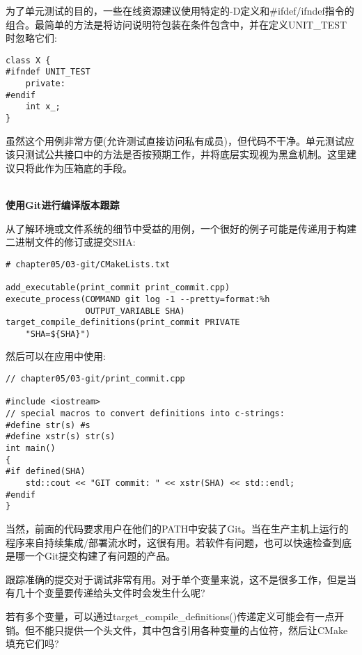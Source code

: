 为了单元测试的目的，一些在线资源建议使用特定的-D定义和\#ifdef/ifndef指令的组合。最简单的方法是将访问说明符包装在条件包含中，并在定义UNIT\_TEST时忽略它们:

\begin{lstlisting}[style=styleCXX]
class X {
#ifndef UNIT_TEST
	private:
#endif
	int x_;
}
\end{lstlisting}

虽然这个用例非常方便(允许测试直接访问私有成员)，但代码不干净。单元测试应该只测试公共接口中的方法是否按预期工作，并将底层实现视为黑盒机制。这里建议只将此作为压箱底的手段。

\hspace*{\fill} \\ %
\noindent
\textbf{使用Git进行编译版本跟踪}

从了解环境或文件系统的细节中受益的用例，一个很好的例子可能是传递用于构建二进制文件的修订或提交SHA:

\begin{lstlisting}[style=styleCMake]
# chapter05/03-git/CMakeLists.txt

add_executable(print_commit print_commit.cpp)
execute_process(COMMAND git log -1 --pretty=format:%h
				OUTPUT_VARIABLE SHA)
target_compile_definitions(print_commit PRIVATE
	"SHA=${SHA}")
\end{lstlisting}  

然后可以在应用中使用:

\begin{lstlisting}[style=styleCXX]
// chapter05/03-git/print_commit.cpp
	
#include <iostream>
// special macros to convert definitions into c-strings:
#define str(s) #s
#define xstr(s) str(s)
int main()
{
#if defined(SHA)
	std::cout << "GIT commit: " << xstr(SHA) << std::endl;
#endif
}
\end{lstlisting}  

当然，前面的代码要求用户在他们的PATH中安装了Git。当在生产主机上运行的程序来自持续集成/部署流水时，这很有用。若软件有问题，也可以快速检查到底是哪一个Git提交构建了有问题的产品。

跟踪准确的提交对于调试非常有用。对于单个变量来说，这不是很多工作，但是当有几十个变量要传递给头文件时会发生什么呢?


若有多个变量，可以通过target\_compile\_definitions()传递定义可能会有一点开销。但不能只提供一个头文件，其中包含引用各种变量的占位符，然后让CMake填充它们吗?

